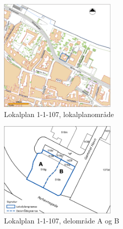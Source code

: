 \begin{figure}[htbp]
	\centering
	\includegraphics[width=0.5\textwidth]{billeder/nylokalplanoversigt.png}
	\caption{Lokalplan 1-1-107, lokalplanområde}
	\label{fig:1-1-107}
\end{figure}

\begin{figure}[htbp]
	\centering
	\includegraphics[width=0.5\textwidth]{billeder/tilbygning.png}
	\caption{Lokalplan 1-1-107, delområde A og B}
	\label{fig:aogb}
\end{figure}

